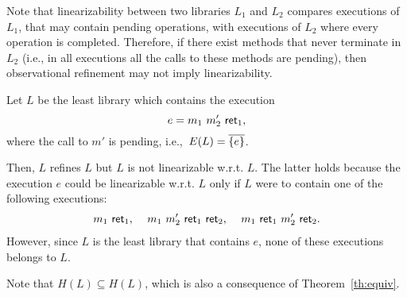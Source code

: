 Note that linearizability between two libraries $L_1$ and $L_2$ compares executions 
of $L_1$, that may contain pending operations, with executions of $L_2$ where every operation 
is completed. Therefore, if there exist methods that never terminate in $L_2$ (i.e., in all executions all the 
calls to these methods are pending), then 
observational refinement may not
imply linearizability. 

\begin{example}
Let $L$ be the least library which contains the execution 
\[
  e = {m_{1}}\ {m'_{2}}\ {\mathsf{ret}_{1}},
\] 
where the call to $m'$ is pending, i.e.,~$E(L) = \overline{{{\{ e \}}}}$.

Then, $L$ refines $L$ but $L$ is not linearizable w.r.t. $L$. The latter holds
because the execution $e$ could be linearizable w.r.t. $L$ only if $L$ were to
contain one of the following executions:
\begin{align*}
  {\ensuremath{m_{1}}}\ {\mathsf{ret}_{1}} \text{, } \quad
  {\ensuremath{m_{1}}}\ {m'_{2}}\ {\mathsf{ret}_{1}}\ {\mathsf{ret}_{2}} \text{, } \quad
  {\ensuremath{m_{1}}}\ {\mathsf{ret}_{1}}\ {m'_{2}}\ {\mathsf{ret}_{2}} \text{.}
\end{align*}
However, since $L$ is the least library that contains $e$, none of these
executions belongs to $L$.

Note that $H(L)\subseteq H(L)$, which is also a consequence of Theorem~\ref{th:equiv}.
\end{example}

%

